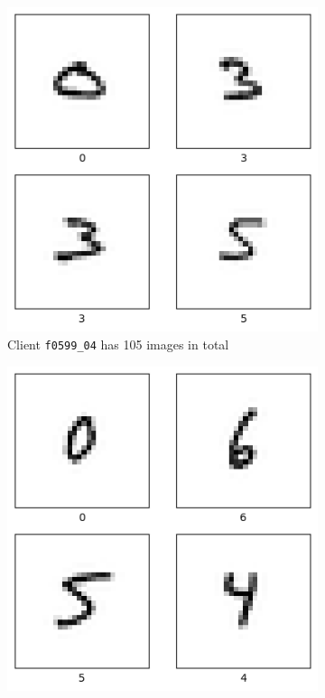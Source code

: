 \begin{figure}[tb]
    \centering
    \begin{subfigure}{0.4\textwidth}
		\centering        
        \includegraphics[width=\linewidth]{Bilder/emnist_client1.png}
        \caption{Client \texttt{f0599\_04} has 105 images in total}
    \end{subfigure}
    \hfill
    \begin{subfigure}{0.4\textwidth}
    		\centering        
        \includegraphics[width=\linewidth]{Bilder/emnist_client2.png}

\end{subfigure}
\end{figure}
